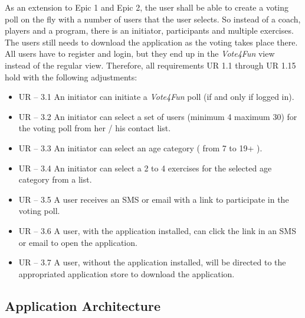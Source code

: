As an extension to Epic 1 and Epic 2, the user shall be able to create a voting poll on the fly with a number of users that the user selects. So instead of a coach, players and a program, there is an initiator, participants and multiple exercises.
The users still needs to download the application as the voting takes place there. All users have to register and login, but they end up in the \textit{Vote4Fun} view instead of the regular view.
\newline
Therefore, all requirements UR 1.1 through UR 1.15 hold with the following adjustments:

\begin{itemize}
    \item UR – 3.1
    \newline
    An initiator can initiate a \textit{Vote4Fun} poll (if and only if logged in).
    \item UR – 3.2
    \newline
    An initiator can select a set of users (minimum 4 maximum 30) for the voting poll from her / his contact list.
    \item UR – 3.3
    \newline
    An initiator can select an age category ( from 7 to 19+ ).
    \item UR – 3.4
    \newline
    An initiator can select a 2 to 4 exercises for the selected age category from a list.
    \item UR – 3.5
    \newline
    A user receives an SMS or email with a link to participate in the voting poll.
    \item UR – 3.6
    \newline
    A user, with the application installed, can click the link in an SMS or email to open the application.
    \item UR – 3.7
    \newline
    A user, without the application installed, will be directed to the appropriated application store to download the application.
\end{itemize}

\subsection{Application Architecture}
\label{ssec:application_architecture}

